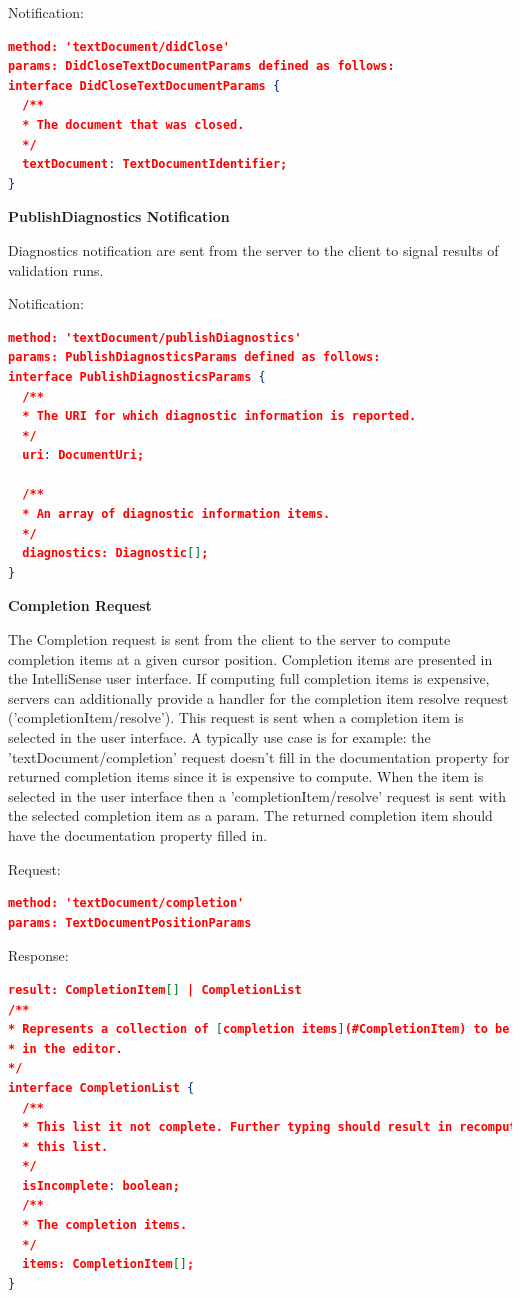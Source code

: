 Notification:
\begin{lstlisting}[language=json,firstnumber=1]
method: 'textDocument/didClose'
params: DidCloseTextDocumentParams defined as follows:
interface DidCloseTextDocumentParams {
  /**
  * The document that was closed.
  */
  textDocument: TextDocumentIdentifier;
}
\end{lstlisting}

\textbf{PublishDiagnostics Notification}

Diagnostics notification are sent from the server to the client to signal results of validation runs.

Notification:
\begin{lstlisting}[language=json,firstnumber=1]
method: 'textDocument/publishDiagnostics'
params: PublishDiagnosticsParams defined as follows:
interface PublishDiagnosticsParams {
  /**
  * The URI for which diagnostic information is reported.
  */
  uri: DocumentUri;
	
  /**
  * An array of diagnostic information items.
  */
  diagnostics: Diagnostic[];
}
\end{lstlisting}
\textbf{Completion Request}

The Completion request is sent from the client to the server to compute completion items at a given cursor position. Completion items are presented in the IntelliSense user interface. If computing full completion items is expensive, servers can additionally provide a handler for the completion item resolve request ('completionItem/resolve'). This request is sent when a completion item is selected in the user interface. A typically use case is for example: the 'textDocument/completion' request doesn't fill in the documentation property for returned completion items since it is expensive to compute. When the item is selected in the user interface then a 'completionItem/resolve' request is sent with the selected completion item as a param. The returned completion item should have the documentation property filled in.

Request:
\begin{lstlisting}[language=json,firstnumber=1]
method: 'textDocument/completion'
params: TextDocumentPositionParams
\end{lstlisting}
Response:
\begin{lstlisting}[language=json,firstnumber=1]
result: CompletionItem[] | CompletionList
/**
* Represents a collection of [completion items](#CompletionItem) to be presented
* in the editor.
*/
interface CompletionList {
  /**
  * This list it not complete. Further typing should result in recomputing
  * this list.
  */
  isIncomplete: boolean;
  /**
  * The completion items.
  */
  items: CompletionItem[];
}
\end{lstlisting}

